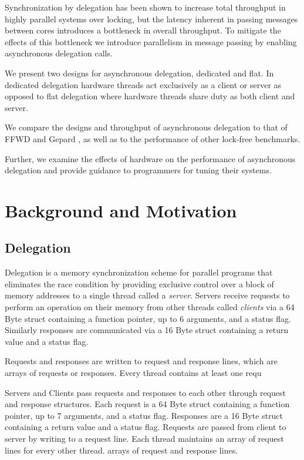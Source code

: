\documentclass{uicthesi}
\begin{document}
\summary
Synchronization by delegation has been shown to increase total throughput in highly parallel systems over locking, \cite{ffwd} but the latency inherent in passing messages between cores introduces a bottleneck in overall throughput. To mitigate the effects of this bottleneck we introduce parallelism in message passing by enabling asynchronous delegation calls. 

We present two designs for asynchronous delegation, dedicated and flat. In dedicated delegation hardware threads act exclusively as a client or server as opposed to flat delegation where hardware threads share duty as both client and server. 

We compare the designs and throughput of asynchronous delegation to that of  FFWD \cite{ffwd} and Gepard \cite{gepard}, as well as to the performance of other lock-free benchmarks. 

Further, we examine the effects of hardware on the performance of asynchronous delegation and provide guidance to programmers for tuning their systems. 

\chapter{Background and Motivation}
\section{Delegation}
Delegation is a memory synchronization scheme for parallel programs that eliminates the race condition by providing exclusive control over a block of memory addresses to a single thread called a \textit{server}. Servers receive requests to perform an operation on their memory from other threads called \textit{clients} via a 64 Byte struct containing a function pointer, up to 6 arguments, and a status flag. Similarly responses are communicated via a 16 Byte struct containing a return value and a status flag.  

Requests and responses are written to request and response lines, which are arrays of requests or responses. Every thread contains at least one requ

Servers and Clients pass requests and responses to each other through request and response structures. Each request is a 64 Byte struct containing a function pointer, up to 7 arguments, and a status flag. Responses are a 16 Byte struct containing a return value and a status flag. Requests are passed from client to server by writing to a request line. Each thread maintains an array of request lines for every other thread.   arrays of request and response lines. 
\end{document}
